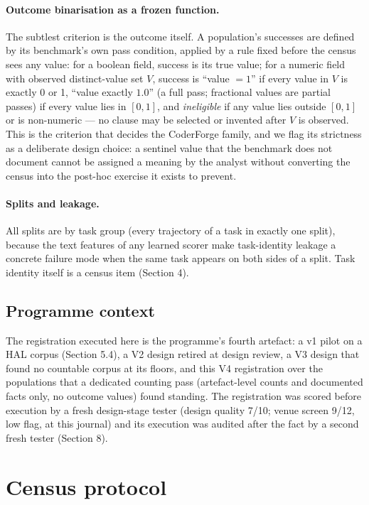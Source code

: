 \documentclass[11pt]{article}
\begin{document}
\paragraph{Outcome binarisation as a frozen function.} The
subtlest criterion is the outcome itself. A population's
successes are defined by its benchmark's own pass condition,
applied by a rule fixed before the census sees any value: for a
boolean field, success is its true value; for a numeric field
with observed distinct-value set $V$, success is ``value $= 1$''
if every value in $V$ is exactly 0 or 1, ``value exactly $1.0$''
(a full pass; fractional values are partial passes) if every
value lies in $[0,1]$, and \emph{ineligible} if any value lies
outside $[0,1]$ or is non-numeric --- no clause may be selected
or invented after $V$ is observed. This is the criterion that
decides the CoderForge family, and we flag its strictness as a
deliberate design choice: a sentinel value that the benchmark
does not document cannot be assigned a meaning by the analyst
without converting the census into the post-hoc exercise it
exists to prevent.

\paragraph{Splits and leakage.} All splits are by task group
(every trajectory of a task in exactly one split), because the
text features of any learned scorer make task-identity leakage
a concrete failure mode when the same task appears on both
sides of a split. Task identity itself is a census item
(Section 4).

\subsection{Programme context}

The registration executed here is the programme's fourth
artefact: a v1 pilot on a HAL corpus (Section 5.4), a V2 design
retired at design review, a V3 design that found no countable
corpus at its floors, and this V4 registration over the
populations that a dedicated counting pass (artefact-level
counts and documented facts only, no outcome values) found
standing. The registration was scored before execution by a
fresh design-stage tester (design quality 7/10; venue screen
9/12, low flag, at this journal) and its execution was audited
after the fact by a second fresh tester (Section 8).

\section{Census protocol}
\end{document}
